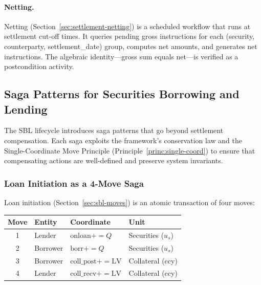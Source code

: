 \documentclass[11pt,a4paper]{article}
\begin{document}
\paragraph{Netting.} Netting (Section~\ref{sec:settlement-netting}) is a scheduled workflow that runs at settlement cut-off times. It queries pending gross instructions for each (security, counterparty, settlement\_date) group, computes net amounts, and generates net instructions. The algebraic identity---gross sum equals net---is verified as a postcondition activity.

\subsection{Saga Patterns for Securities Borrowing and Lending}
\label{sec:sbl-sagas}

The SBL lifecycle introduces saga patterns that go beyond settlement compensation. Each saga exploits the framework's conservation law and the Single-Coordinate Move Principle (Principle~\ref{princ:single-coord}) to ensure that compensating actions are well-defined and preserve system invariants.

\subsubsection{Loan Initiation as a 4-Move Saga}

Loan initiation (Section~\ref{sec:sbl-moves}) is an atomic transaction of four moves:

\begin{center}
\small
\begin{tabular}{c l l l}
\toprule
\textbf{Move} & \textbf{Entity} & \textbf{Coordinate} & \textbf{Unit} \\
\midrule
1 & Lender & $\mathrm{onloan} \mathrel{{+}{=}} Q$ & Securities ($u_s$) \\
2 & Borrower & $\mathrm{borr} \mathrel{{+}{=}} Q$ & Securities ($u_s$) \\
3 & Borrower & $\mathrm{coll\_post} \mathrel{{+}{=}} \mathrm{LV}$ & Collateral (ccy) \\
4 & Lender & $\mathrm{coll\_recv} \mathrel{{+}{=}} \mathrm{LV}$ & Collateral (ccy) \\
\bottomrule
\end{tabular}
\end{center}
\end{document}
